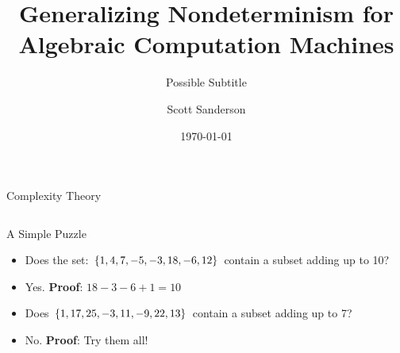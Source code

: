 \documentclass[c]{beamer}
\title{Generalizing Nondeterminism for Algebraic Computation Machines}
\subtitle{Possible Subtitle}
\author{Scott Sanderson}
\institute{Department of Mathematics\\Williams College}
\date{\today}
\begin{document}
\theoremstyle{definition}
\newtheorem{proposition}{Proposition}
\newtheorem{proofidea}{Proof Idea}

\begin{frame}
  \titlepage
\end{frame}

\begin{frame}{Complexity Theory}
  
  \begin{columns}
  \end{columns}

\end{frame}

\begin{frame}{A Simple Puzzle}
  
  \begin{itemize}
  \item Does the set: $\{1,4,7,-5,-3,18,-6,12\}$ contain
    a subset adding up to 10? \pause
  \item Yes.  \textbf{Proof}: $18 - 3 - 6 + 1 = 10$ \pause
  \item Does $\{1, 17, 25, -3, 11, -9, 22, 13\}$ contain a subset
    adding up to 7?\pause
  \item No.  \textbf{Proof}: Try them all! 
  \end{itemize}
  
\end{frame}
\end{document}
